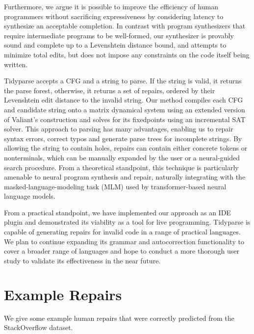 \documentclass[sigplan,review,anonymous,acmsmall]{acmart}\settopmatter{printfolios=false,printccs=false,printacmref=false}
\begin{document}
Furthermore, we argue it is possible to improve the efficiency of human programmers without sacrificing expressiveness by considering latency to synthesize an acceptable completion. In contrast with program synthesizers that require intermediate programs to be well-formed, our synthesizer is provably sound and complete up to a Levenshtein distance bound, and attempts to minimize total edits, but does not impose any constraints on the code itself being written.

Tidyparse accepts a CFG and a string to parse. If the string is valid, it returns the parse forest, otherwise, it returns a set of repairs, ordered by their Levenshtein edit distance to the invalid string. Our method compiles each CFG and candidate string onto a matrix dynamical system using an extended version of Valiant's construction and solves for its fixedpoints using an incremental SAT solver. This approach to parsing has many advantages, enabling us to repair syntax errors, correct typos and generate parse trees for incomplete strings. By allowing the string to contain holes, repairs can contain either concrete tokens or nonterminals, which can be manually expanded by the user or a neural-guided search procedure. From a theoretical standpoint, this technique is particularly amenable to neural program synthesis and repair, naturally integrating with the masked-language-modeling task (MLM) used by transformer-based neural language models.

From a practical standpoint, we have implemented our approach as an IDE plugin and demonstrated its viability as a tool for live programming. Tidyparse is capable of generating repairs for invalid code in a range of practical languages. We plan to continue expanding its grammar and autocorrection functionality to cover a broader range of languages and hope to conduct a more thorough user study to validate its effectiveness in the near future.

\pagebreak

\appendix

\pagebreak\section{Example Repairs}

We give some example human repairs that were correctly predicted from the StackOverflow dataset.
\end{document}
